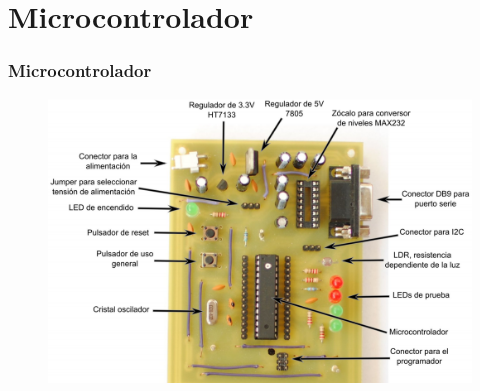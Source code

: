 \section{Microcontrolador}
\begin{frame}
\frametitle{Microcontrolador}
\begin{figure}
\centering
\includegraphics[scale=0.4]{PlacaDescrip}
\end{figure}
\end{frame}